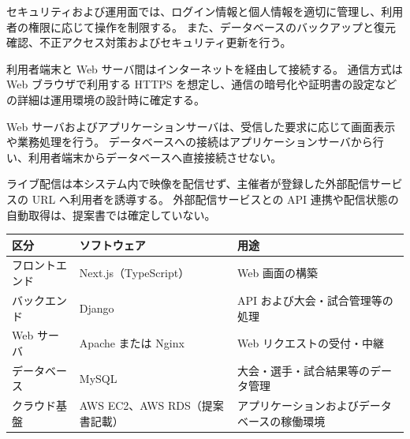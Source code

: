 \documentclass[a4paper,10pt]{ltjsarticle}
\begin{document}
セキュリティおよび運用面では、ログイン情報と個人情報を適切に管理し、利用者の権限に応じて操作を制限する。
また、データベースのバックアップと復元確認、不正アクセス対策およびセキュリティ更新を行う。

利用者端末と Web サーバ間はインターネットを経由して接続する。
通信方式は Web ブラウザで利用する HTTPS を想定し、通信の暗号化や証明書の設定などの詳細は運用環境の設計時に確定する。

Web サーバおよびアプリケーションサーバは、受信した要求に応じて画面表示や業務処理を行う。
データベースへの接続はアプリケーションサーバから行い、利用者端末からデータベースへ直接接続させない。

ライブ配信は本システム内で映像を配信せず、主催者が登録した外部配信サービスの URL へ利用者を誘導する。
外部配信サービスとの API 連携や配信状態の自動取得は、提案書では確定していない。

\begin{tabularx}{\textwidth}{|
>{\raggedright\arraybackslash}p{}|
>{\raggedright\arraybackslash}p{}|
Y|}
\hline
{}
\textbf{区分} &
\textbf{ソフトウェア} &
\textbf{用途} \\
\hline

フロントエンド &
Next.js（TypeScript） &
Web 画面の構築 \\
\hline

バックエンド &
Django &
API および大会・試合管理等の処理 \\
\hline

Web サーバ &
Apache または Nginx &
Web リクエストの受付・中継 \\
\hline

データベース &
MySQL &
大会・選手・試合結果等のデータ管理 \\
\hline

クラウド基盤 &
AWS EC2、AWS RDS（提案書記載） &
アプリケーションおよびデータベースの稼働環境 \\
\hline
\end{tabularx}
\end{document}
